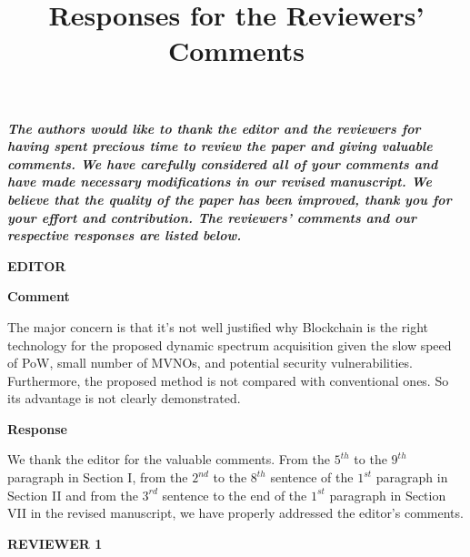 \documentclass[12pt,draftcls, onecolumn]{IEEEtran}
\begin{document}
\title{Responses for the Reviewers' Comments}
\maketitle \vspace{-15mm}


\textbf{\textcolor[rgb]{0.00,0.00,1.00}{\emph{The authors would like
to thank the editor and the reviewers for having spent precious time
to review the paper and giving valuable comments. We have carefully
considered all of your comments and have made necessary
modifications in our revised manuscript. We believe that the quality
of the paper has been improved, thank you for your effort and
contribution. The reviewers' comments and our respective responses
are listed below.}}}

\vspace{5mm} \noindent\textcolor[rgb]{1.00,0.00,0.00}{\textbf{EDITOR}}

\vspace{3mm} \noindent\textcolor[rgb]{1.00,0.00,0.00}{\textbf{Comment}}
\vspace{3mm}

The major concern is that it's not well justified why Blockchain is the right technology for the proposed dynamic spectrum acquisition given the slow speed of PoW, small number of MVNOs, and potential security vulnerabilities. Furthermore, the proposed method is not compared with conventional ones. So its advantage is not clearly demonstrated.

\vspace{3mm} \noindent\textcolor[rgb]{0.00,0.00,1.00}{\textbf{Response}}
\vspace{2mm}

We thank the editor for the valuable comments.  From the $ 5^{th} $ to the $ 9^{th} $ paragraph in Section I, from the $ 2^{nd} $ to the $ 8^{th} $ sentence of the $ 1^{st} $ paragraph in Section II and from the $ 3^{rd} $ sentence to the end of the $ 1^{st} $ paragraph in Section VII  in the revised manuscript, we have properly addressed the editor's comments.
\newpage


\vspace{5mm} \noindent\textcolor[rgb]{1.00,0.00,0.00}{\textbf{REVIEWER
1}}
\end{document}

